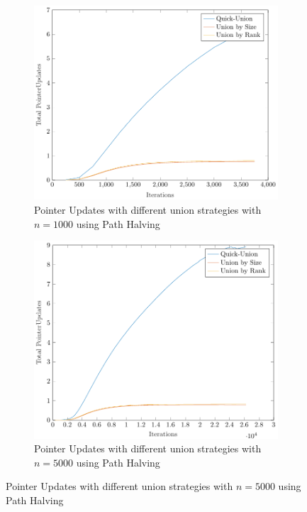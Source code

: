 \begin{figure}[ht]
    \begin{subfigure}{0.32\textwidth}
        \centering
        \includegraphics[width=\textwidth]{../images/plotPHFull1000_PointerUpdates.pdf}
        \caption{Pointer Updates with different union strategies with $n = 1000$ using Path Halving}
    \end{subfigure}%
    \hfill
    \begin{subfigure}{0.32\textwidth}
        \centering
        \includegraphics[width=\textwidth]{../images/plotPHFull5000_PointerUpdates.pdf}
        \caption{Pointer Updates with different union strategies with $n = 5000$ using Path Halving}

\end{subfigure}
\end{figure}
